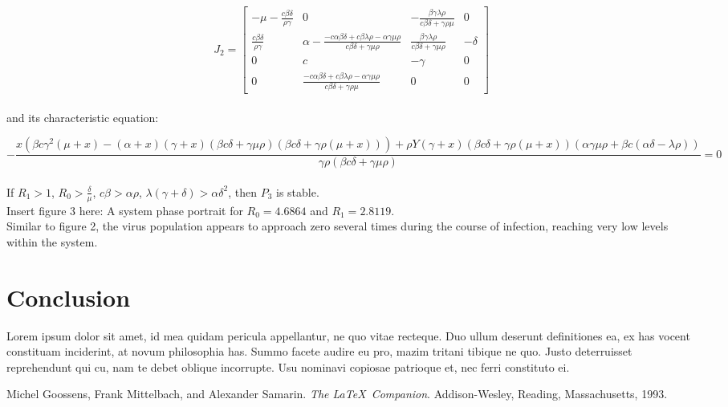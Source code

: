 \documentclass{article}
\begin{document}
\[J_{2} =
	\begin{bmatrix}
		- \mu - \frac{c \beta \delta}{\rho \gamma} & 0 & - \frac{\beta \gamma \lambda \rho}{c \beta \delta + \gamma \rho \mu} & 0 \\
		\frac{c \beta \delta}{\rho \gamma} & \alpha - \frac{-c \alpha \beta \delta + c \beta \lambda \rho - \alpha \gamma \mu \rho}{c \beta \delta + \gamma \mu \rho} & \frac{\beta \gamma \lambda \rho}{c \beta \delta + \gamma \mu \rho} & - \delta \\
		0 & c & - \gamma & 0 \\
		0 & \frac{-c \alpha \beta \delta + c \beta \lambda \rho - \alpha \gamma \mu \rho}{c \beta \delta + \gamma \rho \mu} & 0 & 0
	\end{bmatrix}
\]\\

and its characteristic equation:

\begin{equation}
	- \frac{x(\beta c \gamma^2(\mu + x) - (\alpha + x)(\gamma + x)(\beta c \delta + \gamma \mu \rho)(\beta c \delta + \gamma \rho (\mu + x))) + \rho Y(\gamma + x)(\beta c \delta + \gamma \rho (\mu + x))(\alpha \gamma \mu \rho + \beta c(\alpha \delta - \lambda \rho))}{\gamma \rho(\beta c \delta + \gamma \mu \rho)} = 0
\end{equation}\\

If $R_{1} > 1$, $R_{0} > \frac{\delta}{\mu}$, $c \beta > \alpha \rho$, $\lambda (\gamma + \delta) > \alpha \delta^2$, then $P_{3}$ is stable.\\

Insert figure 3 here: A system phase portrait for $R_{0} = 4.6864$ and $R_{1} = 2.8119$.\\
Similar to figure 2, the virus population appears to approach zero several times during the course of infection, reaching very low levels within the system.


\section{Conclusion}
\label{sub:Conclusion}
Lorem ipsum dolor sit amet, id mea quidam pericula appellantur, ne quo vitae recteque. Duo ullum deserunt definitiones ea, ex has vocent constituam inciderint, at novum philosophia has. Summo facete audire eu pro, mazim tritani tibique ne quo. Justo deterruisset reprehendunt qui cu, nam te debet oblique incorrupte. Usu nominavi copiosae patrioque et, nec ferri constituto ei.



\begin{thebibliography}{9}
Michel Goossens, Frank Mittelbach, and Alexander Samarin. 
\textit{The \LaTeX\ Companion}. 
Addison-Wesley, Reading, Massachusetts, 1993.



\end{thebibliography}
\end{document}
